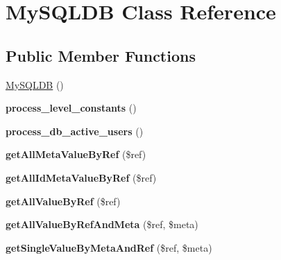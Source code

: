 \hypertarget{class_my_s_q_l_d_b}{\section{My\-S\-Q\-L\-D\-B Class Reference}
\label{class_my_s_q_l_d_b}
}
\subsection*{Public Member Functions}
\begin{DoxyCompactItemize}
\item 
\hyperlink{class_my_s_q_l_d_b_afbb8bc2e0b1b9ce1834d4f1d46de2ee5}{My\-S\-Q\-L\-D\-B} ()
\item 
\hypertarget{class_my_s_q_l_d_b_a3ee8bc6a518aa33de8c2fcee491d917a}{{\bfseries process\-\_\-level\-\_\-constants} ()}\label{class_my_s_q_l_d_b_a3ee8bc6a518aa33de8c2fcee491d917a}

\item 
\hypertarget{class_my_s_q_l_d_b_a56ec8dc82ad65a0b6a1f349c33b3ac84}{{\bfseries process\-\_\-db\-\_\-active\-\_\-users} ()}\label{class_my_s_q_l_d_b_a56ec8dc82ad65a0b6a1f349c33b3ac84}

\item 
\hypertarget{class_my_s_q_l_d_b_a14a61d1bfa0731711281a14a7e5415e6}{{\bfseries get\-All\-Meta\-Value\-By\-Ref} (\$ref)}\label{class_my_s_q_l_d_b_a14a61d1bfa0731711281a14a7e5415e6}

\item 
\hypertarget{class_my_s_q_l_d_b_abc07b00c78d6f323f322c4a83da0dcb1}{{\bfseries get\-All\-Id\-Meta\-Value\-By\-Ref} (\$ref)}\label{class_my_s_q_l_d_b_abc07b00c78d6f323f322c4a83da0dcb1}

\item 
\hypertarget{class_my_s_q_l_d_b_a90879a3096b2421914724e814b197bf1}{{\bfseries get\-All\-Value\-By\-Ref} (\$ref)}\label{class_my_s_q_l_d_b_a90879a3096b2421914724e814b197bf1}

\item 
\hypertarget{class_my_s_q_l_d_b_accf5bb9e6f6c9c18ca4e033ebff130a4}{{\bfseries get\-All\-Value\-By\-Ref\-And\-Meta} (\$ref, \$meta)}\label{class_my_s_q_l_d_b_accf5bb9e6f6c9c18ca4e033ebff130a4}

\item 
\hypertarget{class_my_s_q_l_d_b_af22f5aeab91d83143aba44f9093b1963}{{\bfseries get\-Single\-Value\-By\-Meta\-And\-Ref} (\$ref, \$meta)}\label{class_my_s_q_l_d_b_af22f5aeab91d83143aba44f9093b1963}


\end{DoxyCompactItemize}
